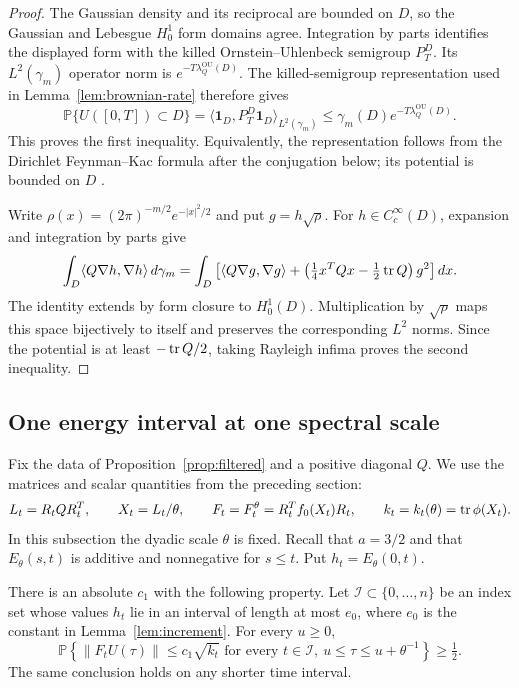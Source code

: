 \begin{proof}
The Gaussian density and its reciprocal are bounded on $D$, so the
Gaussian and Lebesgue $H_0^1$ form domains agree.  Integration by parts
identifies the displayed form with the killed Ornstein--Uhlenbeck
semigroup $P_T^D$.  Its $L^2(\gamma_m)$ operator norm is
$e^{-T\lambda_Q^{\mathrm{OU}}(D)}$.  The killed-semigroup representation
used in Lemma~\ref{lem:brownian-rate} therefore gives
\[
 \mathbb P\{U([0,T])\subset D\}
 =\langle\mathbf1_D,P_T^D\mathbf1_D\rangle_{L^2(\gamma_m)}
 \le\gamma_m(D)e^{-T\lambda_Q^{\mathrm{OU}}(D)}.
\]
This proves the first inequality.  Equivalently, the representation follows
from the Dirichlet Feynman--Kac formula after the conjugation below; its
potential is bounded on $D$ \cite{DaviesSimon1984}.

Write $\rho(x)=(2\pi)^{-m/2}e^{-|x|^2/2}$ and put $g=h\sqrt\rho$.
For $h\in C_c^\infty(D)$, expansion and integration by parts give
\[
 \int_D\langle Q\nabla h,\nabla h\rangle\,d\gamma_m
 =\int_D\left[
    \langle Q\nabla g,\nabla g\rangle
    +\left(\tfrac14 x^TQx-\tfrac12\operatorname{tr} Q\right)g^2
   \right]dx.
\]
The identity extends by form closure to $H_0^1(D)$.  Multiplication by
$\sqrt\rho$ maps this space bijectively to itself and preserves the
corresponding $L^2$ norms.  Since the potential is at least
$-\operatorname{tr} Q/2$, taking Rayleigh infima proves the second inequality.
\end{proof}

\subsection{One energy interval at one spectral scale}

Fix the data of Proposition~\ref{prop:filtered} and a positive diagonal
$Q$.  We use the matrices and scalar quantities from the preceding
section:
\[
 L_t=R_tQR_t^T,\qquad X_t=L_t/\theta,\qquad
 F_t=F_t^\theta=R_t^Tf_0(X_t)R_t,\qquad
 k_t=k_t(\theta)=\operatorname{tr}\phi(X_t).
\]
In this subsection the dyadic scale $\theta$ is fixed.  Recall that
$a=3/2$ and that $E_\theta(s,t)$ is additive and nonnegative for $s\le t$.
Put $h_t=E_\theta(0,t)$.

\begin{lemma}\label{lem:epoch-prob}
There is an absolute $c_1$ with the following property.  Let
$\mathcal I\subset\{0,\ldots,n\}$ be an index set whose values $h_t$
lie in an interval of length at most $e_0$, where $e_0$ is the constant
in Lemma~\ref{lem:increment}.  For every $u\ge0$,
\begin{equation}\label{eq:epoch-prob}
 \mathbb P\left\{
   \lVert F_tU(\tau)\rVert\le c_1\sqrt{k_t}
   \text{ for every }t\in\mathcal I,
   \ u\le\tau\le u+\theta^{-1}
 \right\}\ge\tfrac12.
\end{equation}
The same conclusion holds on any shorter time interval.
\end{lemma}

